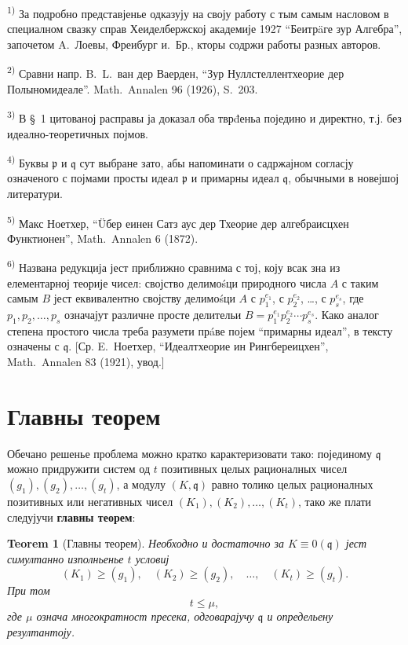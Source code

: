 \documentclass[11pt]{article}
\newcommand{\foreign}[1]{#1}
\theoremstyle{plain}
\newtheorem{satz}{Teorem}
\begin{document}
{\footnotesize
\textsuperscript{1)} За подробно представјенье одказују на своју работу с тым самым
насловом в специалном свазку справ Хеиделбержској академије 1927
``Беитрäге зур Алгебра'', започетом A.\ Лоевы, Фреибург и.\ Бр., кторы
содржи работы разных авторов.

\textsuperscript{2)} Сравни напр. B.\ L.\ ван дер Ваерден, ``Зур Нуллстеллентхеорие дер Полыномидеале''.
\foreign{Math.\ Annalen} 96 (1926), S.~203.

\textsuperscript{3)} В \S~1 цитованој расправы ја доказал оба тврđеньа поједино и директно,
т.ј. без идеално-теоретичных појмов.

\textsuperscript{4)} Буквы $\mathfrak{p}$ и $\mathfrak{q}$ сут выбране зато, абы напоминати
о садржајном согласју означеного с појмами просты идеал
$\mathfrak{p}$ и примарны идеал $\mathfrak{q}$, обычными в новејшој литератури.

\textsuperscript{5)} Макс Ноетхер, ``Üбер еинен Сатз аус дер Тхеорие дер алгебраисцхен Функтионен'',
\foreign{Math.\ Annalen} 6 (1872).

\textsuperscript{6)} Названа редукција јест приближно сравнима с тој, коју всак зна из
елементарној теорије чисел: својство делимоśци природного числа
$A$ с таким самым $B$ јест еквивалентно својству делимоśци $A$ с
$p_{1}^{e_{1}}$, с $p_{2}^{e_{2}}$, \ldots, с $p_{s}^{e_{s}}$, где
$p_{1}, p_{2}, \ldots, p_{s}$ означајут различне просте делительи
$B = p_{1}^{e_{1}}p_{2}^{e_{2}} \cdots p_{s}^{e_{s}}$. Како аналог
степена простого числа треба разумети прáве појем ``примарны идеал'',
в тексту означены с $\mathfrak{q}$. [Ср. E.\ Ноетхер,
``Идеалтхеорие ин Рингбереицхен'', \foreign{Math.\ Annalen} 83 (1921), увод.]
}

\newpage
\section*{Главны теорем}

Обечано решенье проблема можно кратко карактеризовати тако:
појединому $\mathfrak{q}$ можно придружити систем од $t$ позитивных
целых рационалных чисел $(g_{1}), (g_{2}), \ldots, (g_{t})$, а
модулу $(K, \mathfrak{q})$ равно толико целых рационалных позитивных
или негативных чисел $(K_{1}), (K_{2}), \ldots, (K_{t})$, тако же
плати следујучи \textbf{главны теорем}:

\begin{satz}[Главны теорем]\label{satz:kap-II}
Необходно и достаточно за $K \equiv 0(\mathfrak{q})$ јест
симултанно изполньенье $t$ условиј
\[
(K_{1}) \geq (g_{1}), \quad (K_{2}) \geq (g_{2}), \quad\ldots,\quad (K_{t}) \geq (g_{t}).
\]
При том
\[
t \leq \mu,
\]
где $\mu$ означа многократност пресека, одговарајучу
$\mathfrak{q}$ и определьену резултантоју.
\end{satz}
\end{document}

